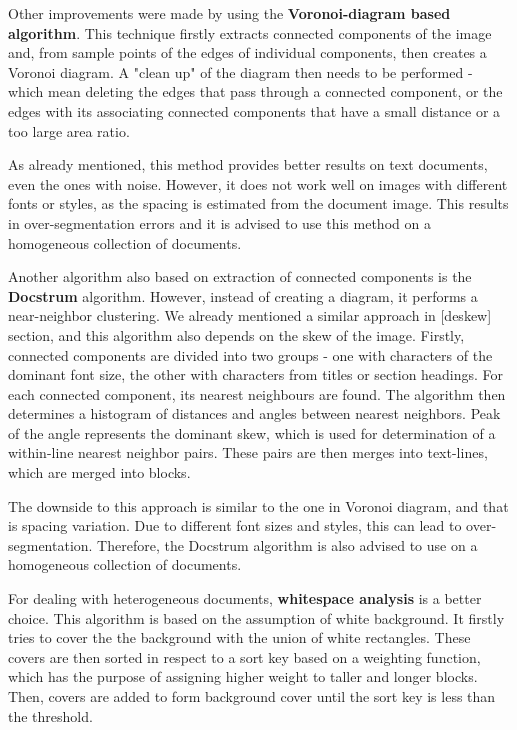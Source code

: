 \begin{description}
\item Other improvements were made by using the \textbf{Voronoi-diagram based algorithm}. This technique firstly extracts connected components of the image and, from sample points of the edges of individual components, then creates a Voronoi diagram. A "clean up" of the diagram then needs to be performed - which mean deleting the edges that pass through a connected component, or the edges with its associating connected components that have a small distance or a too large area ratio.

As already mentioned, this method provides better results on text documents, even the ones with noise. However, it does not work well on images with different fonts or styles, as the spacing is estimated from the document image. This results in over-segmentation errors and it is advised to use this method on a homogeneous collection of documents.

\item Another algorithm also based on extraction of connected components is the \textbf{Docstrum} algorithm. However, instead of creating a diagram, it performs a near-neighbor clustering. We already mentioned a similar approach in [deskew] section, and this algorithm also depends on the skew of the image. Firstly, connected components are divided into two groups - one with characters of the dominant font size, the other with characters from titles or section headings. For each connected component, its nearest neighbours are found. The algorithm then determines a histogram of distances and angles between nearest neighbors. Peak of the angle represents the dominant skew, which is used for determination of a within-line nearest neighbor pairs. These pairs are then merges into text-lines, which are merged into blocks.

The downside to this approach is similar to the one in Voronoi diagram, and that is spacing variation. Due to different font sizes and styles, this can lead to over-segmentation. Therefore, the Docstrum algorithm is also advised to use on a homogeneous collection of documents.

\item For dealing with heterogeneous documents, \textbf{whitespace analysis} is a better choice. This algorithm is based on the assumption of white background. It firstly tries to cover the the background with the union of white rectangles. These covers are then sorted in respect to a sort key based on a weighting function, which has the purpose of assigning higher weight to taller and longer blocks. Then, covers are added to form background cover until the sort key is less than the threshold.


\end{description}
